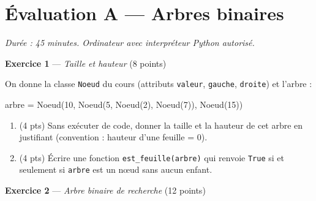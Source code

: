 \section*{Évaluation A --- Arbres binaires}
\textit{Durée : 45 minutes. Ordinateur avec interpréteur Python autorisé.}


\bigskip

\textbf{Exercice 1} --- \textit{Taille et hauteur} \hfill (8 points)

On donne la classe \lstinline{Noeud} du cours (attributs \lstinline{valeur}, \lstinline{gauche}, \lstinline{droite}) et l'arbre :
\begin{python}
arbre = Noeud(10, Noeud(5, Noeud(2), Noeud(7)), Noeud(15))
\end{python}
\begin{enumerate}
  \item (4 pts) Sans exécuter de code, donner la taille et la hauteur de cet arbre en justifiant (convention : hauteur d'une feuille = $0$).
  \item (4 pts) Écrire une fonction \lstinline{est_feuille(arbre)} qui renvoie \lstinline{True} si et seulement si \lstinline{arbre} est un nœud sans aucun enfant.
\end{enumerate}


\bigskip

\textbf{Exercice 2} --- \textit{Arbre binaire de recherche} \hfill (12 points)

